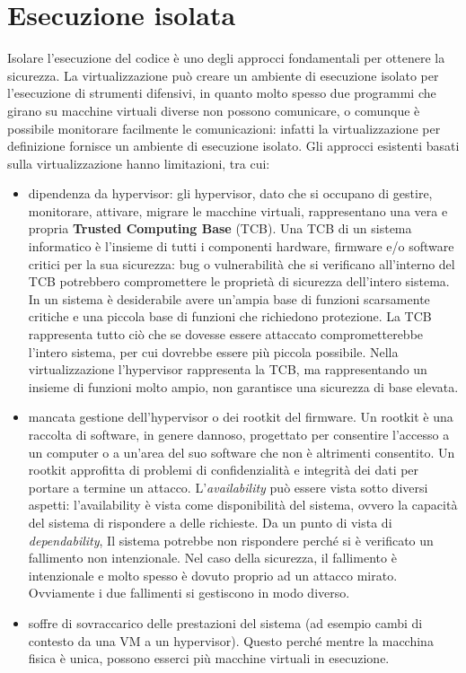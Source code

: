 \section{Esecuzione isolata}
Isolare l'esecuzione del codice è uno degli approcci fondamentali per ottenere la sicurezza. La virtualizzazione può creare un ambiente di esecuzione isolato per l'esecuzione di strumenti difensivi, in quanto molto spesso due programmi che girano su macchine virtuali diverse non possono comunicare, o comunque è possibile monitorare facilmente le comunicazioni: infatti la virtualizzazione per definizione fornisce un ambiente di esecuzione isolato. Gli approcci esistenti basati sulla virtualizzazione hanno limitazioni, tra cui:
\begin{itemize}
    \item dipendenza da hypervisor: gli hypervisor, dato che si occupano di gestire, monitorare, attivare, migrare le macchine virtuali, rappresentano una vera e propria \textbf{Trusted Computing Base} (TCB). Una TCB di un sistema informatico è l'insieme di tutti i componenti hardware, firmware e/o software critici per la sua sicurezza: bug o vulnerabilità che si verificano all'interno del TCB potrebbero compromettere le proprietà di sicurezza dell'intero sistema. In un sistema è desiderabile avere un'ampia base di funzioni scarsamente critiche e una piccola base di funzioni che richiedono protezione. La TCB rappresenta tutto ciò che se dovesse essere attaccato comprometterebbe l'intero sistema, per cui dovrebbe essere più piccola possibile. Nella virtualizzazione l'hypervisor rappresenta la TCB, ma rappresentando un insieme di funzioni molto ampio, non garantisce una sicurezza di base elevata.
    \item mancata gestione dell'hypervisor o dei rootkit del firmware. Un rootkit è una raccolta di software, in genere dannoso, progettato per consentire l'accesso a un computer o a un'area del suo software che non è altrimenti consentito. Un rootkit approfitta di problemi di confidenzialità e integrità dei dati per portare a termine un attacco. L'\textit{availability} può essere vista sotto diversi aspetti: l'availability è vista come disponibilità del sistema, ovvero la capacità del sistema di rispondere a delle richieste. Da un punto di vista di \textit{dependability}, Il sistema potrebbe non rispondere perché si è verificato un fallimento non intenzionale. Nel caso della sicurezza, il fallimento è intenzionale e molto spesso è dovuto proprio ad un attacco mirato. Ovviamente i due fallimenti si gestiscono in modo diverso.
    \item soffre di sovraccarico delle prestazioni del sistema (ad esempio cambi di contesto da una VM a un hypervisor). Questo perché mentre la macchina fisica è unica, possono esserci più macchine virtuali in esecuzione. 
\end{itemize}

